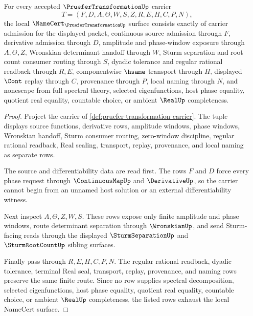 \begin{theorem}
\label{thm:pruefer-transformation-namecert-obligations}
For every accepted $\PrueferTransformationUp$ carrier
$$
T=(F,D,A,\Theta,W,S,Z,R,E,H,C,P,N),
$$
the local $\NameCert_{\PrueferTransformationUp}$ surface consists exactly of carrier admission for the displayed packet, continuous source admission through $F$, derivative admission through $D$, amplitude and phase-window exposure through $A,\Theta,Z$, Wronskian determinant handoff through $W$, Sturm separation and root-count consumer routing through $S$, dyadic tolerance and regular rational readback through $R,E$, componentwise $\hsame$ transport through $H$, displayed $\Cont$ replay through $C$, provenance through $P$, local naming through $N$, and nonescape from full spectral theory, selected eigenfunctions, host phase equality, quotient real equality, countable choice, or ambient $\RealUp$ completeness.
\end{theorem}
\begin{proof}
Project the carrier of \autoref{def:pruefer-transformation-carrier}. The tuple displays source functions, derivative rows, amplitude windows, phase windows, Wronskian handoff, Sturm consumer routing, zero-window discipline, regular rational readback, Real sealing, transport, replay, provenance, and local naming as separate rows.

The source and differentiability data are read first. The rows $F$ and $D$ force every phase request through $\ContinuousMapUp$ and $\DerivativeUp$, so the carrier cannot begin from an unnamed host solution or an external differentiability witness.

Next inspect $A,\Theta,Z,W,S$. These rows expose only finite amplitude and phase windows, route determinant separation through $\WronskianUp$, and send Sturm-facing reads through the displayed $\SturmSeparationUp$ and $\SturmRootCountUp$ sibling surfaces.

Finally pass through $R,E,H,C,P,N$. The regular rational readback, dyadic tolerance, terminal Real seal, transport, replay, provenance, and naming rows preserve the same finite route. Since no row supplies spectral decomposition, selected eigenfunctions, host phase equality, quotient real equality, countable choice, or ambient $\RealUp$ completeness, the listed rows exhaust the local NameCert surface.
\end{proof}

